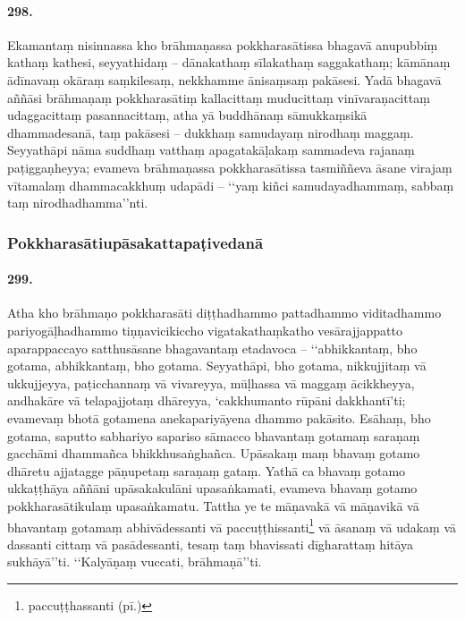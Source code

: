 \paragraph{298.} Ekamantaṃ nisinnassa kho brāhmaṇassa pokkharasātissa bhagavā anupubbiṃ kathaṃ kathesi, seyyathidaṃ – dānakathaṃ sīlakathaṃ saggakathaṃ; kāmānaṃ ādīnavaṃ okāraṃ saṃkilesaṃ, nekkhamme ānisaṃsaṃ pakāsesi. Yadā bhagavā aññāsi brāhmaṇaṃ pokkharasātiṃ kallacittaṃ muducittaṃ vinīvaraṇacittaṃ udaggacittaṃ pasannacittaṃ, atha yā buddhānaṃ sāmukkaṃsikā dhammadesanā, taṃ pakāsesi – dukkhaṃ samudayaṃ nirodhaṃ maggaṃ. Seyyathāpi nāma suddhaṃ vatthaṃ apagatakāḷakaṃ sammadeva rajanaṃ paṭiggaṇheyya; evameva brāhmaṇassa pokkharasātissa tasmiññeva āsane virajaṃ vītamalaṃ dhammacakkhuṃ udapādi – ‘‘yaṃ kiñci samudayadhammaṃ, sabbaṃ taṃ nirodhadhamma’’nti.

\subsubsection{Pokkharasātiupāsakattapaṭivedanā}

\paragraph{299.} Atha kho brāhmaṇo pokkharasāti diṭṭhadhammo pattadhammo viditadhammo pariyogāḷhadhammo tiṇṇavicikiccho vigatakathaṃkatho vesārajjappatto aparappaccayo satthusāsane bhagavantaṃ etadavoca – ‘‘abhikkantaṃ, bho gotama, abhikkantaṃ, bho gotama. Seyyathāpi, bho gotama, nikkujjitaṃ vā ukkujjeyya, paṭicchannaṃ vā vivareyya, mūḷhassa vā maggaṃ ācikkheyya, andhakāre vā telapajjotaṃ dhāreyya, ‘cakkhumanto rūpāni dakkhantī’ti; evamevaṃ bhotā gotamena anekapariyāyena dhammo pakāsito. Esāhaṃ, bho gotama, saputto sabhariyo sapariso sāmacco bhavantaṃ gotamaṃ saraṇaṃ gacchāmi dhammañca bhikkhusaṅghañca. Upāsakaṃ maṃ bhavaṃ gotamo dhāretu ajjatagge pāṇupetaṃ saraṇaṃ gataṃ. Yathā ca bhavaṃ gotamo ukkaṭṭhāya aññāni upāsakakulāni upasaṅkamati, evameva bhavaṃ gotamo pokkharasātikulaṃ upasaṅkamatu. Tattha ye te māṇavakā vā māṇavikā vā bhavantaṃ gotamaṃ abhivādessanti vā paccuṭṭhissanti\footnote{paccuṭṭhassanti (pī.)} vā āsanaṃ vā udakaṃ vā dassanti cittaṃ vā pasādessanti, tesaṃ taṃ bhavissati dīgharattaṃ hitāya sukhāyā’’ti. ‘‘Kalyāṇaṃ vuccati, brāhmaṇā’’ti.

